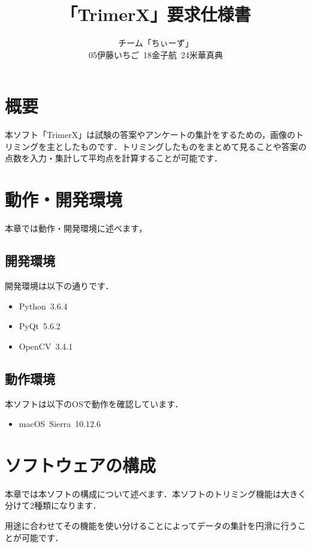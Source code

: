 \documentclass[12pt]{jsreport}
\title{「TrimerX」要求仕様書}
\author{チーム「ちぃーず」\\05伊藤いちご\ 18金子航\ 24米華真典}
\date{}
\begin{document}
\maketitle
\newpage

\setcounter{tocdepth}{2}
\tableofcontents

\newpage

\setcounter{page}{1}

\section{概要}
本ソフト「TrimerX」は試験の答案やアンケートの集計をするための，画像のトリミングを主としたものです．トリミングしたものをまとめて見ることや答案の点数を入力・集計して平均点を計算することが可能です．

\newpage

\section{動作・開発環境}
本章では動作・開発環境に述べます，

\subsection{開発環境}

開発環境は以下の通りです．
\begin{itemize}
    \item Python\ 3.6.4
    \item PyQt\ 5.6.2
    \item OpenCV\ 3.4.1
\end{itemize}


\subsection{動作環境}
本ソフトは以下のOSで動作を確認しています．

\begin{itemize}
    \item macOS\ Sierra\ 10.12.6
\end{itemize}


\newpage


\section{ソフトウェアの構成}
本章では本ソフトの構成について述べます．本ソフトのトリミング機能は大きく分けて2種類になります．

用途に合わせてその機能を使い分けることによってデータの集計を円滑に行うことが可能です．
\end{document}

